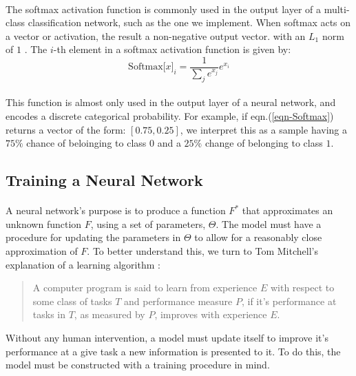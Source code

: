 \documentclass[12pt,letterpaper]{article}
\begin{document}
\paragraph*{}The softmax activation function is commonly used in the output layer of a multi-class classification network, such as the one we implement. When softmax acts on a vector or activation, the result a non-negative output vector. with an $L_1$ norm of $1$ \cite{Geron,Goodfellow,Virtanen}. The $i$-th element in a softmax activation function is given by:
\begin{equation}
\label{eqn-Softmax}
\text{Softmax}\big[ x \big]_{i} = \frac{1}{\sum_{j}e^{x_j}}e^{x_i}
\end{equation}

\paragraph*{}This function is almost only used in the output layer of a neural network, and encodes a discrete categorical probability. For example, if eqn.(\ref{eqn-Softmax}) returns a vector of the form: $[ 0.75 , 0.25]$, we interpret this as a sample having a $75\%$ chance of beloinging to class $0$ and a $25\%$ change of belonging to class $1$.



\subsection{Training a Neural Network}
\label{subsec-Training}

\paragraph*{}A neural network's purpose is to produce a function $F^*$ that approximates an unknown function $F$, using a set of parameters, $\Theta$. The model must have a procedure for updating the parameters in $\Theta$ to allow for a reasonably close approximation of $F$. To better understand this, we turn to Tom Mitchell's explanation of a learning algorithm \cite{Goodfellow,Mitchell}:
\begin{quote}
A computer program is said to learn from experience $E$ with respect to some class of tasks $T$ and performance measure $P$, if it's performance at tasks in $T$, as measured by $P$, improves with experience $E$.
\end{quote}
Without any human intervention, a model must update itself to improve it's performance at a give task a new information is presented to it. To do this, the model must be constructed with a training procedure in mind. 
\end{document}
